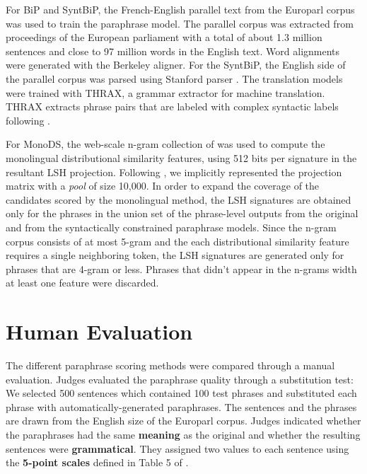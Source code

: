 \documentclass[11pt]{article}
\begin{document}
For BiP and SyntBiP, the French-English parallel text from the Europarl corpus \cite{Koehn05} was used to train the paraphrase model. The parallel corpus was extracted from proceedings of the European parliament with a total of about 1.3 million sentences and close to 97 million words in the English text. Word alignments were generated with the Berkeley aligner. For the SyntBiP, the English side of the parallel corpus was parsed using Stanford parser \cite{KleinManning03}. 
The translation models were trained with THRAX, a grammar extractor for machine translation. %
THRAX extracts phrase pairs that are labeled with complex syntactic labels following .

For MonoDS, the web-scale n-gram collection of  was used
to compute the monolingual distributional similarity features, using 512 bits
per signature in the resultant LSH projection. Following
, we implicitly represented the projection matrix
with a \emph{pool} of size 10,000. In order to expand the coverage of the
candidates scored by the monolingual method, the LSH signatures are obtained
only for the phrases in the union set of the phrase-level outputs from the
original and from the syntactically constrained paraphrase models. Since the
n-gram corpus consists of at most 5-gram and the each distributional similarity
feature requires a single neighboring token, the LSH signatures are generated
only for phrases that are 4-gram or less. Phrases that didn't appear in the
n-grams width at least one feature were discarded.



\section{Human Evaluation}

The different paraphrase scoring methods were compared through a manual evaluation.   
%
Judges evaluated the paraphrase quality through a substitution test: We selected 500 sentences
 which contained 100 test phrases and substituted each phrase with automatically-generated paraphrases. The sentences and the phrases are drawn from the English size of the Europarl corpus.  Judges indicated whether the paraphrases had the same {\bf meaning} as the original and whether the resulting sentences were {\bf grammatical}.  They assigned two values to each sentence using the {\bf 5-point scales} defined in Table 5 of .
\end{document}
